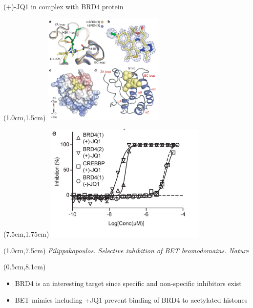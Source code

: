 \documentclass{beamer}					%
\begin{document}
\begin{frame}{(+)-JQ1 in complex with BRD4 protein}

\begin{textblock*}{6cm}(1.0cm,1.5cm)
\includegraphics[width=6cm]{JQ1_Complex.png}
\end{textblock*}

\begin{textblock*}{8cm}(7.5cm,1.75cm)
\includegraphics[width=8cm]{BRD4-Inhibition.png}
\end{textblock*}

\begin{textblock*}{\textwidth}(1.0cm,7.5cm)
\textit{Filippakopoulos. Selective inhibition of BET bromodomains. Nature }

\begin{textblock*}{14cm}(0.5cm,8.1cm)
\begin{itemize}
\item BRD4 is an interesting target since specific and non-specific inhibitors exist
\item BET mimics including +JQ1 prevent binding of BRD4 to acetylated histones
\end{itemize}
\end{textblock*}

\end{textblock*}


\end{frame}
\end{document}
